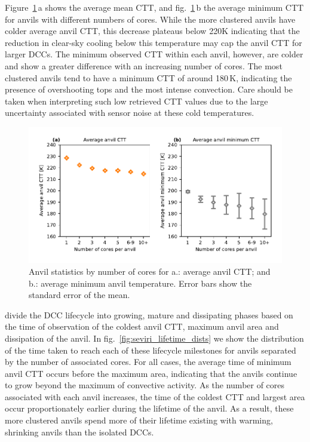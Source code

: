 \documentclass[acp, manuscript]{copernicus}
\begin{document}
Figure~\ref{fig:seviri_anvil_ctt_stats}\,a shows the average mean CTT, and fig.~\ref{fig:seviri_anvil_ctt_stats}\,b the average minimum CTT for anvils with different numbers of cores. 
While the more clustered anvils have colder average anvil CTT, this decrease plateaus below 220K indicating that the reduction in clear-sky cooling below this temperature may cap the anvil CTT for larger DCCs. 
The minimum observed CTT within each anvil, however, are colder and show a greater difference with an increasing number of cores. 
The most clustered anvils tend to have a minimum CTT of around 180\,\unit{K}, indicating the presence of overshooting tops and the most intense convection. 
Care should be taken when interpreting such low retrieved CTT values due to the large uncertainty associated with sensor noise at these cold temperatures.


\begin{figure}[tp]
    \includegraphics[width=12cm]{figures/fig07.pdf}
    \caption[
    Anvil statistics by number of cores for average anvil CTT and average minimum anvil temperature
    ]{
    Anvil statistics by number of cores for a.: average anvil CTT; and b.: average minimum anvil temperature. Error bars show the standard error of the mean.
    }
    \label{fig:seviri_anvil_ctt_stats}
\end{figure}


\citet{futyan_deep_2007} divide the DCC lifecycle into growing, mature and dissipating phases based on the time of observation of the coldest anvil CTT, maximum anvil area and dissipation of the anvil. 
In fig.~\ref{fig:seviri_lifetime_dists} we show the distribution of the time taken to reach each of these lifecycle milestones for anvils separated by the number of associated cores. 
For all cases, the average time of minimum anvil CTT occurs before the maximum area, indicating that the anvils continue to grow beyond the maximum of convective activity. 
As the number of cores associated with each anvil increases, the time of the coldest CTT and largest area occur proportionately earlier during the lifetime of the anvil. 
As a result, these more clustered anvils spend more of their lifetime existing with warming, shrinking anvils than the isolated DCCs.
\end{document}
